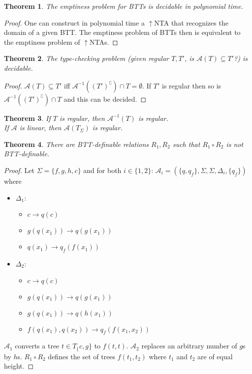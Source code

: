 \documentclass{article}
\newtheorem{theorem}{Theorem}[section]
\begin{document}
\begin{theorem}
	The emptiness problem for BTTs is decidable in polynomial time.
\end{theorem}
\begin{proof}
	One can construct in polynomial time a $\uparrow$NTA that recognizes the domain of a given BTT. The emptiness problem of BTTs then is equivalent to the emptiness problem of $\uparrow$NTAs.
\end{proof}

\begin{theorem}
	The type-checking problem (given regular $T, T'$, is $\mathcal{A}(T) \subseteq T'$?) is decidable.
\end{theorem}
\begin{proof}
	$\mathcal{A}(T) \subseteq T'$ iff $\mathcal{A}^{-1}((T')^\complement) \cap T = \emptyset$. If $T'$ is regular then so is $\mathcal{A}^{-1}((T')^\complement) \cap T$ and this can be decided.
\end{proof}

\begin{theorem}
	If $T$ is regular, then $\mathcal{A}^{-1}(T)$ is regular. \\
	If $\mathcal{A}$ is linear, then $\mathcal{A}(T_\Sigma)$ is regular.
\end{theorem}

\begin{theorem}
	There are BTT-definable relations $R_1, R_2$ such that $R_1 \circ R_2$ is not BTT-definable.
\end{theorem}
\begin{proof}
	Let $\Sigma = \{f,g,h,c\}$ and for both $i \in \{1,2\}$: $\mathcal{A}_i = (\{q,q_f\}, \Sigma, \Sigma, \Delta_i, \{q_f\})$ where 
	\begin{itemize}
		\item $\Delta_1$:
		\begin{itemize}
			\item $c \rightarrow q(c)$
			\item $g(q(x_1)) \rightarrow q(g(x_1))$
			\item $q(x_1) \rightarrow q_f(f(x_1))$
		\end{itemize}
		\item $\Delta_2$:
		\begin{itemize}
			\item $c \rightarrow q(c)$
			\item $g(q(x_1)) \rightarrow q(g(x_1))$
			\item $g(q(x_1)) \rightarrow q(h(x_1))$
			\item $f(q(x_1), q(x_2)) \rightarrow q_f(f(x_1, x_2))$
		\end{itemize}
	\end{itemize}
	
	$\mathcal{A}_1$ converts a tree $t \in T_\{c,g\}$ to $f(t, t)$.
	$\mathcal{A}_2$ replaces an arbitrary number of $g$s by $h$s.
	$R_1 \circ R_2$ defines the set of trees $f(t_1, t_2)$ where $t_1$ and $t_2$ are of equal height.
\end{proof}
\end{document}
